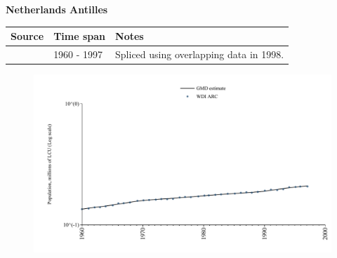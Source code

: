 \documentclass[12pt,a4paper,landscape]{article}
\begin{document}
\begin{adjustbox}{max totalsize={\paperwidth}{\paperheight},center}
\begin{minipage}[t][\textheight][t]{\textwidth}
\vspace*{0.5cm}
{}
\begin{center}
{\Large\bfseries Netherlands Antilles}
\end{center}
\vspace{0.5cm}
\begin{table}[H]
\centering
\small
\begin{tabular}{|l|l|l|}
\hline
\textbf{Source} & \textbf{Time span} & \textbf{Notes} \\
\hline
\rowcolor{white}\cite{WDI_ARC}& 1960 - 1997 &Spliced using overlapping data in 1998.\\
\hline
\end{tabular}
\end{table}
\begin{figure}[H]
\centering
\includegraphics[width=\textwidth,height=0.6\textheight,keepaspectratio]{graphs/ANT_pop.pdf}
\end{figure}
\end{minipage}
\end{adjustbox}
\end{document}
